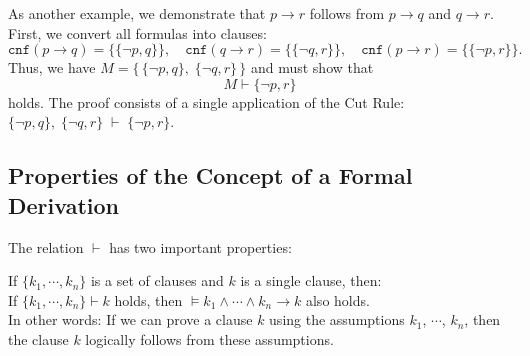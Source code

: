 As another example, we  demonstrate that $p \rightarrow r$ follows from $p \rightarrow q$ and $q \rightarrow r$.
First, we convert all formulas into clauses:
\[ \texttt{cnf}(p \rightarrow q) = \bigl\{ \{ \neg p, q \} \bigr\}, \quad
   \texttt{cnf}(q \rightarrow r) = \bigl\{ \{ \neg q, r \} \bigr\}, \quad 
   \texttt{cnf}(p \rightarrow r) = \bigl\{ \{ \neg p, r \} \bigr\}.
\]
Thus, we have $M = \bigl\{\, \{ \neg p, q \},\; \{ \neg q, r \}\,\bigr\}$ and must show that
\[ M \vdash  \{ \neg p, r \} \]
holds. The proof consists of a single application of the Cut Rule:
\\[0.2cm]
\hspace*{1.3cm}
$ \{ \neg p, q \},\; \{ \neg q, r \} \;\vdash\; \{ \neg p, r \}$.  \eox

\subsection{Properties of the Concept of a Formal Derivation}
The relation $\vdash$ has two important properties:

\begin{Theorem}[\textcolor{blue}{Correctness}]
  If $\{k_1, \cdots, k_n \}$ is a set of clauses and $k$ is a single clause,
  then:
  \\[0.2cm]
  \hspace*{3.3cm} If $\{k_1, \cdots, k_n \} \vdash k$ holds, then $\models k_1 \wedge \cdots \wedge
  k_n \rightarrow k$ also holds.
  \\[0.2cm]
  In other words: If we can prove a clause $k$ using the assumptions $k_1$, $\cdots$, $k_n$,
  then the clause $k$ logically follows from these assumptions.
\end{Theorem}

